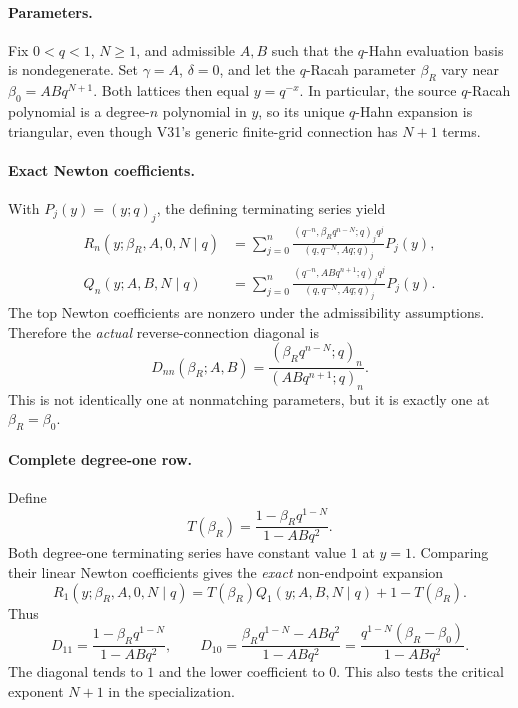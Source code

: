 \documentclass[11pt]{article}
\begin{document}
\paragraph{Parameters.} Fix $0<q<1$, $N\ge1$, and admissible $A,B$ such that the $q$-Hahn evaluation basis is nondegenerate. Set $\gamma=A$, $\delta=0$, and let the $q$-Racah parameter $\beta_R$ vary near $\beta_0=ABq^{N+1}$. Both lattices then equal $y=q^{-x}$. In particular, the source $q$-Racah polynomial is a degree-$n$ polynomial in $y$, so its unique $q$-Hahn expansion is triangular, even though V31's generic finite-grid connection has $N+1$ terms.

\paragraph{Exact Newton coefficients.} With $P_j(y)=(y;q)_j$, the defining terminating series yield
\begin{align*}
R_n(y;\beta_R,A,0,N\mid q)
 &=\sum_{j=0}^n \frac{(q^{-n},\beta_R q^{n-N};q)_j q^j}{(q,q^{-N},Aq;q)_j}P_j(y),\\
Q_n(y;A,B,N\mid q)
 &=\sum_{j=0}^n \frac{(q^{-n},ABq^{n+1};q)_j q^j}{(q,q^{-N},Aq;q)_j}P_j(y).
\end{align*}
The top Newton coefficients are nonzero under the admissibility assumptions. Therefore the \emph{actual} reverse-connection diagonal is
\begin{equation}\label{eq:v123-diagonal}
\boxed{D_{nn}(\beta_R;A,B)=\frac{(\beta_R q^{n-N};q)_n}{(ABq^{n+1};q)_n}.}
\end{equation}
This is not identically one at nonmatching parameters, but it is exactly one at $\beta_R=\beta_0$.

\paragraph{Complete degree-one row.} Define
\[
T(\beta_R)=\frac{1-\beta_R q^{1-N}}{1-ABq^2}.
\]
Both degree-one terminating series have constant value $1$ at $y=1$. Comparing their linear Newton coefficients gives the \emph{exact} non-endpoint expansion
\begin{equation}\label{eq:v123-degree-one}
\boxed{R_1(y;\beta_R,A,0,N\mid q)=T(\beta_R)Q_1(y;A,B,N\mid q)+1-T(\beta_R).}
\end{equation}
Thus
\[
\boxed{D_{11}=\frac{1-\beta_R q^{1-N}}{1-ABq^2},\qquad
D_{10}=\frac{\beta_R q^{1-N}-ABq^2}{1-ABq^2}
=\frac{q^{1-N}(\beta_R-\beta_0)}{1-ABq^2}.}
\]
The diagonal tends to $1$ and the lower coefficient to $0$. This also tests the critical exponent $N+1$ in the specialization.
\end{document}
